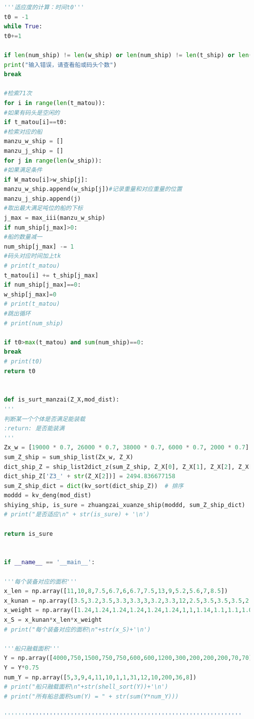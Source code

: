 \documentclass{whutmod}
\begin{document}
\begin{lstlisting}[language=python]
'''适应度的计算：时间t0'''
t0 = -1
while True:
t0+=1

if len(num_ship) != len(w_ship) or len(num_ship) != len(t_ship) or len(W_matou) != len(t_matou):
print("输入错误，请查看船或码头个数")
break

#检索71次
for i in range(len(t_matou)):
#如果有码头是空闲的
if t_matou[i]==t0:
#检索对应的船
manzu_w_ship = []
manzu_j_ship = []
for j in range(len(w_ship)):
#如果满足条件
if W_matou[i]>w_ship[j]:
manzu_w_ship.append(w_ship[j])#记录重量和对应重量的位置
manzu_j_ship.append(j)
#取出最大满足吨位的船的下标
j_max = max_iii(manzu_w_ship)
if num_ship[j_max]>0:
#船的数量减一
num_ship[j_max] -= 1
#码头对应时间加上tk
# print(t_matou)
t_matou[i] += t_ship[j_max]
if num_ship[j_max]==0:
w_ship[j_max]=0
# print(t_matou)
#跳出循环
# print(num_ship)

if t0>max(t_matou) and sum(num_ship)==0:
break
# print(t0)
return t0


def is_surt_manzai(Z_X,mod_dist):
'''
判断某一个个体是否满足能装载
:return: 是否能装满
'''
Zx_w = [19000 * 0.7, 26000 * 0.7, 38000 * 0.7, 6000 * 0.7, 2000 * 0.7]
sum_Z_ship = sum_ship_list(Zx_w, Z_X)
dict_ship_Z = ship_list2dict_z(sum_Z_ship, Z_X[0], Z_X[1], Z_X[2], Z_X[3], Z_X[4])  # 船变字典
dict_ship_Z['Z3_' + str(Z_X[2])] = 2494.836677158
sum_Z_ship_dict = dict(kv_sort(dict_ship_Z))  # 排序
moddd = kv_deng(mod_dist)
shiying_ship, is_sure = zhuangzai_xuanze_ship(moddd, sum_Z_ship_dict)
# print("是否适应\n" + str(is_sure) + '\n')

return is_sure


if __name__ == '__main__':

'''每个装备对应的面积'''
x_len = np.array([11,10,8,7.5,6.7,6,6.7,7.5,13,9,5.2,5.6,7,8.5])
x_kunan = np.array([3.5,3.2,3.5,3.3,3.3,3,3.2,3.3,12,2.5,3.5,3.5,3.5,2.4])
x_weight = np.array([1.24,1.24,1.24,1.24,1.24,1.24,1,1,1.14,1.1,1.1,1.05,1.24,1.05])
x_S = x_kunan*x_len*x_weight
# print("每个装备对应的面积\n"+str(x_S)+'\n')

'''船只融载面积'''
Y = np.array([4000,750,1500,750,750,600,600,1200,300,200,200,200,70,70])
Y = Y*0.75
num_Y = np.array([5,3,9,4,11,10,1,1,31,12,10,200,36,8])
# print("船只融载面积\n"+str(shell_sort(Y))+'\n')
# print("所有船总面积sum(Y) = " + str(sum(Y*num_Y)))

''''''''''''''''''''''''''''''''''''''''''''''''''''''''''''''''''''


\end{lstlisting}
\end{document}
